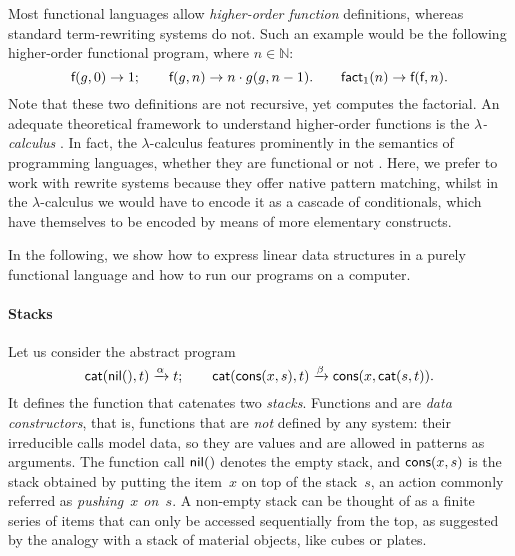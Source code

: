 Most functional languages allow \emph{higher-order
  function}
definitions, whereas standard term\hyp{}rewriting systems do not. Such
an example would be the following higher\hyp{}order functional
program, where \(n \in \mathbb{N}\):
\begin{equation*}
\textsf{f}(g,0) \rightarrow 1;
\qquad
\textsf{f}(g,n) \rightarrow n \cdot g(g,n-1).
\qquad
\textsf{fact}_1(n) \rightarrow \textsf{f}(\textsf{f},n).
\end{equation*}
Note that these two definitions are not recursive, yet
 computes the
factorial. An adequate theoretical
framework to understand higher\hyp{}order functions is the
\emph{\(\lambda\)-calculus}\hspace*{-2.1pt}
\citep{HindleySeldin_2008,VanLeeuwen_1990b}.
 In fact, the
\(\lambda\)-calculus features prominently in the semantics of
programming languages, whether they are functional or not
\citep{Winskel_1993,Reynolds_1998,Pierce_2002,FriedmanWand_2008,TurbakGifford_2008}. Here,
we prefer to work with rewrite systems because they offer native
pattern matching, whilst in the
\(\lambda\)-calculus we
would have to encode it as a cascade of conditionals, which have
themselves to be encoded by means of more elementary constructs.

In the following, we show how to express linear data structures in a
purely functional language and how to run our programs on a computer.

\paragraph{Stacks}
\label{par:stacks}

Let us consider the abstract program
\begin{equation*}
\textsf{cat}(\textsf{nil}(),t)     \xrightarrow{\smash{\alpha}} t;\qquad
\textsf{cat}(\textsf{cons}(x,s),t) \xrightarrow{\smash{\beta}}
                                \textsf{cons}(x,\textsf{cat}(s,t)).
\end{equation*}
It defines the function  that
catenates  two \emph{stacks}. Functions
 and  are \emph{data
constructors}, that is,
functions that are \emph{not} defined by any system: their irreducible
calls model data, so they are values and are allowed in patterns as
arguments. The function call \(\textsf{nil}()\) denotes the empty stack,
and \(\textsf{cons}(x,s)\) is the stack obtained by putting the
item~\(x\) on top of the stack~\(s\), an action commonly referred as
\textsl{pushing~\(x\) on~\(s\)}. A non\hyp{}empty stack can be thought
of as a finite series of items that can only be accessed sequentially
from the top, as suggested by the analogy with a stack of material
objects, like cubes or plates.

